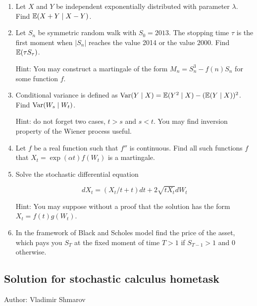 \documentclass[pdftex,12pt,a4paper]{article}
\begin{document}
\begin{enumerate}

\item Let $X$ and $Y$ be independent exponentially distributed with parameter $\lambda$. Find $\mathbb{E}(X+Y \mid X-Y)$.

\item Let $S_n$ be symmetric random walk with $S_0=2013$. The stopping time $\tau$ is the first moment when $|S_n|$ reaches the value 2014 or the value $2000$. Find $\mathbb{E}(\tau S_{\tau})$.

Hint: You may construct a martingale of the form $M_n=S_n^3-f(n)S_n$ for some function $f$.

\item Conditional variance is defined as $\operatorname{Var}(Y \mid X)=\mathbb{E}(Y^2 \mid X) - (\mathbb{E}(Y \mid X) )^2$. Find $\operatorname{Var}(W_s \mid W_t)$. 

Hint: do not forget two cases, $t>s$ and $s<t$. You may find inversion property of the Wiener process useful.

\item Let $f$ be a real function such that $f''$ is continuous. Find all such functions $f$ that $X_t=\exp(\alpha t)f(W_t)$ is a martingale. 

\item Solve the stochastic differential equation 

\[
dX_t=(X_t/t+t)dt+2\sqrt{tX_t}dW_t
\]

Hint: You may suppose without a proof that the solution has the form $X_t=f(t)g(W_t)$. 

\item In the framework of Black and Scholes model find the price of the asset, which pays you $S_T$ at the fixed moment of time $T>1$ if $S_{T-1}>1$ and $0$ otherwise.
  

\end{enumerate}

\subsection{Solution for stochastic calculus hometask}

Author: Vladimir Shmarov
\newcommand{\ds}{\displaystyle}
\newcommand{\dx}{\mathrm{d}x}
\newcommand{\dy}{\mathrm{d}y}
\newcommand{\dz}{\mathrm{d}z}
\newcommand{\du}{\mathrm{d}u}
\newcommand{\dv}{\mathrm{d}v}
\end{document}
